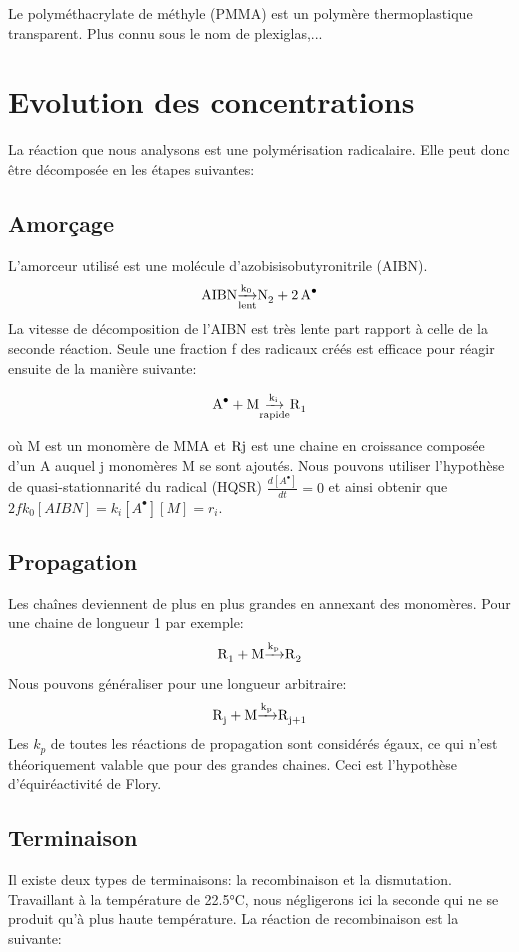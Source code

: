 \documentclass[a4paper,oneside,12pt]{article}
\begin{document}
Le polyméthacrylate de méthyle (PMMA) est un polymère thermoplastique transparent. Plus connu sous le nom de plexiglas,...

\section{Evolution des concentrations}
La réaction que nous analysons est une polymérisation radicalaire. Elle peut donc être décomposée en les étapes suivantes:
\subsection{Amorçage}
L'amorceur utilisé est une molécule d'azobisisobutyronitrile (AIBN). 
\begin{equation}
	\ce{AIBN \underset{lent}{\xrightarrow{k_0}} N2 + 2A^\bullet}
\end{equation}	
La vitesse de décomposition de l'AIBN est très lente part rapport à celle de la seconde réaction. Seule une fraction f des radicaux créés est efficace pour réagir ensuite de la manière suivante:

\begin{equation}
\ce{A^{\bullet} + M \underset{rapide}{\xrightarrow{k_i}} R1} 
\end{equation}

où M est un monomère de MMA et $\ce{Rj}$ est une chaine en croissance composée d'un A auquel j monomères M se sont ajoutés. Nous pouvons utiliser l'hypothèse de quasi-stationnarité du radical (HQSR) $\frac{d[A^{\bullet}]}{dt}=0$ et ainsi obtenir que $2fk_{0}[AIBN]=k_{i}[A^{\bullet}][M]=r_i$.

\subsection{Propagation}
Les chaînes deviennent de plus en plus grandes en annexant des monomères. Pour une chaine de longueur 1 par exemple:
\begin{equation}
\ce{R1 + M \xrightarrow{k_p} R2}
\end{equation}
Nous pouvons généraliser pour une longueur arbitraire:
\begin{equation}
\ce{R_{j} + M \xrightarrow{k_p} R_{j+1}}
\end{equation}
Les $k_{p}$ de toutes les réactions de propagation sont considérés égaux, ce qui n'est théoriquement valable que pour des grandes chaines. Ceci est l'hypothèse d'équiréactivité de Flory.

\subsection{Terminaison}
Il existe deux types de terminaisons: la recombinaison et la dismutation. Travaillant à la température de 22.5°C, nous négligerons ici la seconde qui ne se produit qu'à plus haute température. La réaction de recombinaison est la suivante:
\end{document}
